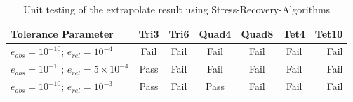 \begin{table} 		
	\caption{Unit testing of the extrapolate result using Stress-Recovery-Algorithms}
	\label{tab: SRTesting}
	\begin{tabular}{l*{5}{c}r} 
		
		Tolerance Parameter    & Tri3 & Tri6 & Quad4 & Quad8 & Tet4  & Tet10  \\
		\hline
		$e_{abs}=10^{-10}$; $e_{rel}=10^{-4}$ & Fail & Fail & Fail & Fail & Fail & Fail   \\
		$e_{abs}=10^{-10}$; $e_{rel}=5\times10^{-4}$&  Pass& Fail & Fail & Fail & Fail &  Fail  \\
		$e_{abs}=10^{-10}$; $e_{rel}=10^{-3}$ & Pass & Fail & Pass & Fail &  Fail & Fail   \\
		\hline
	\end{tabular}
\end{table}

